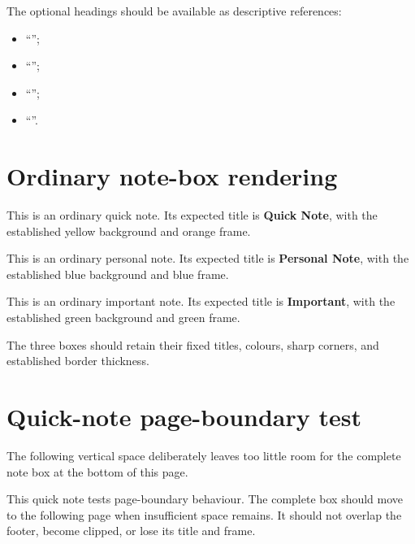 \documentclass{studentnotes}
\begin{document}
The optional headings should be available as descriptive references:

\begin{itemize}
    \item ``'';
    \item ``'';
    \item ``'';
    \item ``''.
\end{itemize}

\section{Ordinary note-box rendering}

\begin{quicknote}
    This is an ordinary quick note. Its expected title is
    \textbf{Quick Note}, with the established yellow background and
    orange frame.
\end{quicknote}

\begin{personalnote}
    This is an ordinary personal note. Its expected title is
    \textbf{Personal Note}, with the established blue background and
    blue frame.
\end{personalnote}

\begin{importantnote}
    This is an ordinary important note. Its expected title is
    \textbf{Important}, with the established green background and
    green frame.
\end{importantnote}

The three boxes should retain their fixed titles, colours, sharp
corners, and established border thickness.

\clearpage
\section{Quick-note page-boundary test}

The following vertical space deliberately leaves too little room for
the complete note box at the bottom of this page.

\rule{0pt}{0.78\textheight}

\begin{quicknote}
    This quick note tests page-boundary behaviour. The complete box
    should move to the following page when insufficient space remains.
    It should not overlap the footer, become clipped, or lose its title
    and frame.
\end{quicknote}
\end{document}
